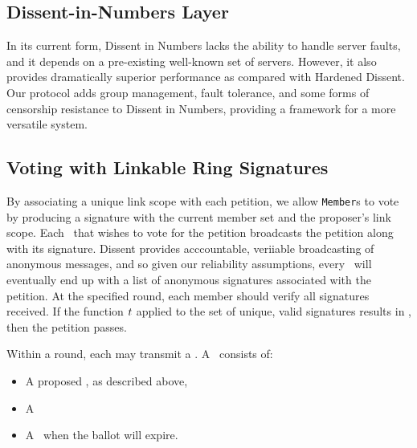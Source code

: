 \subsection{Dissent-in-Numbers Layer}
In its current form, Dissent in Numbers lacks the ability to handle server
faults, and it depends on a pre-existing well-known set of servers. However, it
also provides dramatically superior performance as compared with Hardened
Dissent. Our protocol adds group management, fault tolerance, and some forms of
censorship resistance to Dissent in Numbers, providing a framework for a more
versatile system.


\subsection{Voting with Linkable Ring Signatures}
By associating a unique link scope with each petition, we allow \texttt{Member}s
to vote by producing a signature with the current member set and the proposer's
link scope. Each \KwMember~that wishes to vote for the petition broadcasts
the petition along with its signature. Dissent provides acccountable, veriiable
broadcasting of anonymous messages, and so given our reliability assumptions,
every \KwMember~will eventually end up with a list of anonymous signatures
associated with the petition. At the specified round, each member should verify
all signatures received. If the function $t$ applied to the set of unique, valid
signatures results in \AtomTrue, then the petition passes.

Within a round, each \KwMember may  transmit a \KwPetition. A
\KwPetition~consists of:
\begin{itemize}
  \item A proposed \KwManifest, as described above,
  \item A \KwLinkScope{}
  \item A \KwRound~when the ballot will expire.
\end{itemize}

